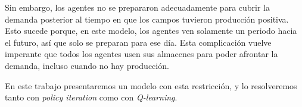 Sin embargo, los agentes no se prepararon adecuadamente para cubrir la demanda posterior al tiempo en que los campos tuvieron producci\'on positiva. Esto sucede porque, en este modelo, los agentes ven solamente un periodo hacia el futuro, as\'i que solo se preparan para ese d\'ia. Esta complicaci\'on vuelve imperante que todos los agentes usen sus almacenes para poder afrontar la demanda, incluso cuando no hay producci\'on.

En este trabajo presentaremos un modelo con esta restricci\'on, y lo resolveremos tanto con \textit{policy iteration} como con \textit{Q-learning}.
